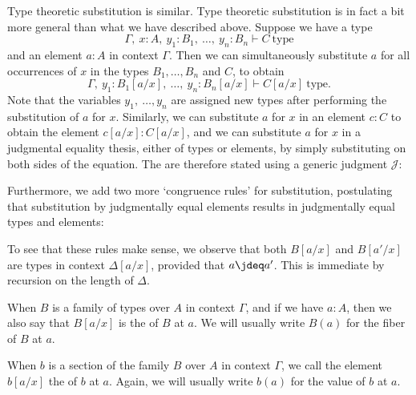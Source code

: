 Type theoretic substitution is similar. Type theoretic substitution is in fact a bit more general than what we have described above. Suppose we have a type
\begin{equation*}
  \Gamma,~x:A,~y_{1}:B_{1},~\ldots,~y_{n}:B_{n}\vdash C~\textrm{type}
\end{equation*}
and an element $a:A$ in context $\Gamma$. Then we can simultaneously substitute $a$ for all occurrences of $x$ in the types $B_1,\ldots,B_n$ and $C$, to obtain
\begin{equation*}
  \Gamma,~y_{1}:B_{1}[a/x],~\ldots,~y_{n}:B_{n}[a/x]\vdash C[a/x]~\mathrm{type}.
\end{equation*}
Note that the variables $y_{1},~\ldots,y_{n}$ are assigned new types after performing the substitution of $a$ for $x$. Similarly, we can substitute $a$ for $x$ in an element $c:C$ to obtain the element $c[a/x]:C[a/x]$, and we can substitute $a$ for $x$ in a judgmental equality thesis, either of types or elements, by simply substituting on both sides of the equation. The  are therefore stated using a generic judgment $\mathcal{J}$:
\begin{prooftree}
\end{prooftree}
Furthermore, we add two more `congruence rules' for substitution, postulating that substitution by judgmentally equal elements results in judgmentally equal types and elements:
\begin{prooftree}
\end{prooftree}
\begin{prooftree}
\end{prooftree}
To see that these rules make sense, we observe that both $B[a/x]$ and $B[a'/x]$ are types in context $\Delta[a/x]$, provided that $a\jdeq a'$. This is immediate by recursion on the length of $\Delta$.

\begin{defn}
  When $B$ is a family of types over $A$ in context $\Gamma$, and if we have $a:A$, then we also say that $B[a/x]$ is the  of $B$ at $a$. We will usually write $B(a)$ for the fiber of $B$ at $a$.

  When $b$ is a section of the family $B$ over $A$ in context $\Gamma$, we call the element $b[a/x]$ the  of $b$ at $a$. Again, we will usually write $b(a)$ for the value of $b$ at $a$.
\end{defn}

